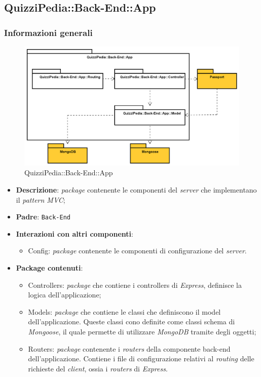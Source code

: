 \subsection{QuizziPedia::Back-End::App}
\subsubsection{Informazioni generali}
\label{QuizziPedia::Back-End::App}
\begin{figure}[ht]
	\centering
	\includegraphics[scale=0.45]{UML/Package/QuizziPedia_Back-End_App.png}
	\caption{QuizziPedia::Back-End::App}
\end{figure}
\FloatBarrier
	\begin{itemize}
		\item \textbf{Descrizione}:
		\textit{package} contenente le componenti del \textit{server} che implementano il \textit{pattern\ped{G} MVC};
		\item \textbf{Padre}: \texttt{Back-End}
		\item \textbf{Interazioni con altri componenti}:
			\begin{itemize}
				\item Config:
				\textit{package} contenente le componenti di configurazione del \textit{server}.
			\end{itemize}
		\item \textbf{Package contenuti}:
			\begin{itemize}
				\item Controllers:
				\textit{package} che contiene i controllers di \textit{Express}, definisce la logica dell'applicazione;
				\item Models:
				\textit{package} che contiene le classi che definiscono il model dell'applicazione. Queste classi cono definite come classi schema di \textit{Mongoose}, il quale permette di utilizzare \textit{MongoDB} tramite degli oggetti;
				\item Routers:
				\textit{package} contenente i \textit{routers} della componente back-end dell'applicazione. Contiene i file di configurazione relativi al \textit{routing} delle richieste del \textit{client}, ossia i \textit{routers} di \textit{Express}.
			\end{itemize}
	\end{itemize}